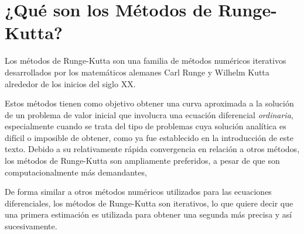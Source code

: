 \section{¿Qué son los Métodos de Runge-Kutta?}

Los métodos de Runge-Kutta son una familia de métodos numéricos iterativos desarrollados por los matemáticos alemanes Carl Runge y Wilhelm Kutta alrededor de los inicios del siglo XX.\@

Estos métodos tienen como objetivo obtener una curva aproximada a la solución de un problema de valor inicial que involucra una ecuación diferencial \textit{ordinaria}, especialmente cuando se trata del tipo de problemas cuya solución analítica es difícil o imposible de obtener, como ya fue establecido en la introducción de este texto. Debido a su relativamente rápida convergencia en relación a otros métodos, los métodos de Runge-Kutta son ampliamente preferidos, a pesar de que son computacionalmente más demandantes,

De forma similar a otros métodos numéricos utilizados para las ecuaciones diferenciales, los métodos de Runge-Kutta son iterativos, lo que quiere decir que una primera estimación es utilizada para obtener una segunda más precisa y así sucesivamente.
